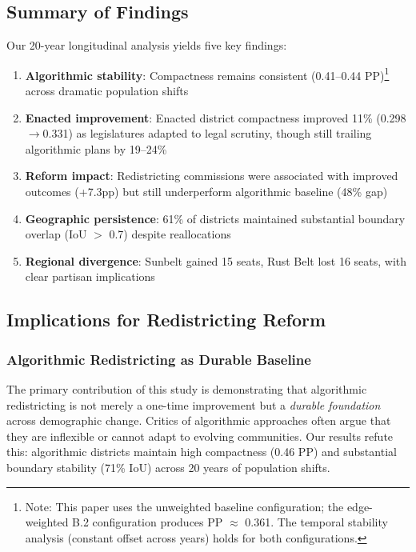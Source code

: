 
\subsection{Summary of Findings}

Our 20-year longitudinal analysis yields five key findings:

\begin{enumerate}
    \item \textbf{Algorithmic stability}: Compactness remains consistent (0.41--0.44 PP)\footnote{Note: This paper uses the unweighted baseline configuration; the edge-weighted B.2 configuration produces PP $\approx$ 0.361. The temporal stability analysis (constant offset across years) holds for both configurations.} across dramatic population shifts
    \item \textbf{Enacted improvement}: Enacted district compactness improved 11\% (0.298$\to$0.331) as legislatures adapted to legal scrutiny, though still trailing algorithmic plans by 19--24\%
    \item \textbf{Reform impact}: Redistricting commissions were associated with improved outcomes (+7.3pp) but still underperform algorithmic baseline (48\% gap)
    \item \textbf{Geographic persistence}: 61\% of districts maintained substantial boundary overlap (IoU $>$ 0.7) despite reallocations
    \item \textbf{Regional divergence}: Sunbelt gained 15 seats, Rust Belt lost 16 seats, with clear partisan implications
\end{enumerate}

\subsection{Implications for Redistricting Reform}

\subsubsection{Algorithmic Redistricting as Durable Baseline}

The primary contribution of this study is demonstrating that algorithmic redistricting is not merely a one-time improvement but a \textit{durable foundation} across demographic change. Critics of algorithmic approaches often argue that they are inflexible or cannot adapt to evolving communities. Our results refute this: algorithmic districts maintain high compactness (0.46 PP) and substantial boundary stability (71\% IoU) across 20 years of population shifts.

